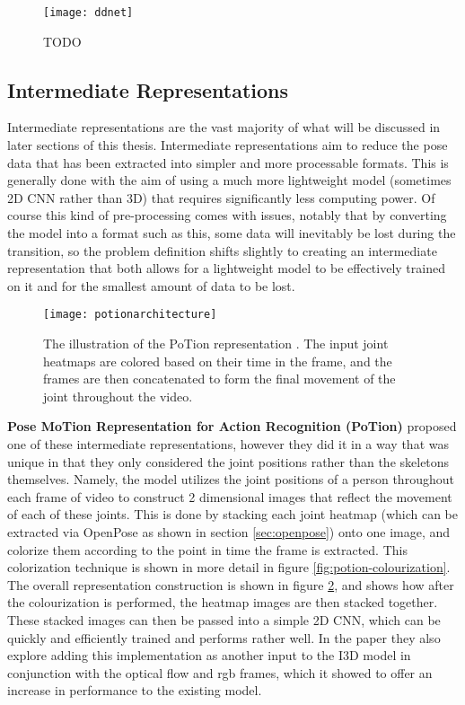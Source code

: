 \begin{figure}[h]
	\texttt{[image: ddnet]}
	\centering
	\caption{TODO}
	\label{fig:ddnet}
\end{figure}

\subsection{Intermediate Representations}

Intermediate representations are the vast majority of what will be discussed in later sections of this thesis. Intermediate representations aim to reduce the pose data that has been extracted into simpler and more processable formats. This is generally done with the aim of using a much more lightweight model (sometimes 2D CNN rather than 3D) that requires significantly less computing power. Of course this kind of pre-processing comes with issues, notably that by converting the model into a format such as this, some data will inevitably be lost during the transition, so the problem definition shifts slightly to creating an intermediate representation that both allows for a lightweight model to be effectively trained on it and for the smallest amount of data to be lost.

\begin{figure}[h]
	\texttt{[image: potionarchitecture]}
	\centering
	\caption{The illustration of the PoTion representation \cite{potion}. The input joint heatmaps are colored based on their time in the frame, and the frames are then concatenated to form the final movement of the joint throughout the video.}
	\label{fig:potion-architecture}
\end{figure}

\textbf{Pose MoTion Representation for Action Recognition (PoTion)} \cite{potion} proposed one of these intermediate representations, however they did it in a way that was unique in that they only considered the joint positions rather than the skeletons themselves. Namely, the model utilizes the joint positions of a person throughout each frame of video to construct 2 dimensional images that reflect the movement of each of these joints. This is done by stacking each joint heatmap (which can be extracted via OpenPose \cite{openpose} as shown in section \ref{sec:openpose}) onto one image, and colorize them according to the point in time the frame is extracted. This colorization technique is shown in more detail in figure \ref{fig:potion-colourization}. The overall representation construction is shown in figure \ref{fig:potion-architecture}, and shows how after the colourization is performed, the heatmap images are then stacked together. These stacked images can then be passed into a simple 2D CNN, which can be quickly and efficiently trained and performs rather well. In the paper they also explore adding this implementation as another input to the I3D \cite{i3d} model in conjunction with the optical flow and rgb frames, which it showed to offer an increase in performance to the existing model.

